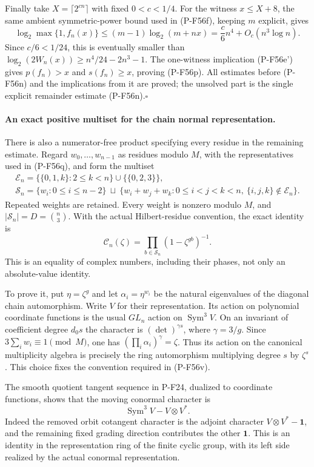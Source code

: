 Finally take $X=\lceil2^{cn}\rceil$ with fixed $0<c<1/4$.
For the witness $x\le X+8$, the same ambient symmetric-power
bound used in (P-F56f), keeping $m$ explicit, gives
\[
 \log_2\max\{1,f_n(x)\}
 \le (m-1)\log_2(m+nx)
 =\frac c6 n^4+O_c(n^3\log n).
 \tag{P-F56t}
\]
Since $c/6<1/24$, this is eventually smaller than
$\log_2(2W_n(x))\ge n^4/24-2n^3-1$.
The one-witness implication (P-F56e') gives
$p(f_n)>x$ and $s(f_n)\ge x$, proving (P-F56p).
All estimates before (P-F56n) and the implications from it
are proved; the unsolved part is the single explicit
remainder estimate (P-F56n).\hfill$\square$

\paragraph{An exact positive multiset for the chain normal representation.}
There is also a numerator-free product specifying every residue
in the remaining estimate. Regard
$w_0,\ldots,w_{n-1}$ as residues modulo $M$, with the
representatives used in (P-F56q), and form the multiset
\[
 \begin{gathered}
 \mathcal E_n=
 \{\{0,1,k\}:2\le k<n\}\cup\{\{0,2,3\}\},\\
 \mathcal S_n=\{w_i:0\le i\le n-2\}\ \sqcup\
 \{w_i+w_j+w_k:0\le i<j<k<n,\
       \{i,j,k\}\notin\mathcal E_n\}.
 \end{gathered}
 \tag{P-F56u}
\]
Repeated weights are retained. Every weight is nonzero modulo
$M$, and $|\mathcal S_n|=D=\binom n3$.
With the actual Hilbert-residue convention, the exact identity is
\[
 \mathcal C_n(\zeta)=
                 \prod_{b\in\mathcal S_n}(1-\zeta^{gb})^{-1}.
 \tag{P-F56v}
\]
This is an equality of complex numbers, including their phases,
not only an absolute-value identity.

To prove it, put $\eta=\zeta^g$ and let
$\alpha_i=\eta^{w_i}$ be the natural eigenvalues of the diagonal
chain automorphism. Write $V$ for their representation.
Its action on polynomial coordinate functions is the usual
$GL_n$ action on $\operatorname{Sym}^3 V$.
On an invariant of coefficient degree $d_0s$ the character is
$(\det)^{\gamma s}$, where $\gamma=3/g$.
Since $3\sum_i w_i\equiv1\pmod M$, one has
$(\prod_i\alpha_i)^\gamma=\zeta$.
Thus its action on the canonical multiplicity algebra is precisely
the ring automorphism multiplying degree $s$ by $\zeta^s$.
This choice fixes the convention required in (P-F56v).

The smooth quotient tangent sequence in P-F24, dualized to
coordinate functions, shows that the moving conormal character is
\[
 \operatorname{Sym}^3 V-V\otimes V^*.
 \tag{P-F56w}
\]
Indeed the removed orbit cotangent character is the adjoint
character $V\otimes V^*-\mathbf1$, and the remaining fixed
grading direction contributes the other $\mathbf1$.
This is an identity in the representation ring of the finite
cyclic group, with its left side realized by the actual
conormal representation.

